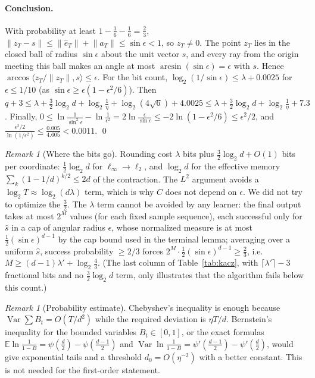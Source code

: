 \documentclass[11pt]{article}
\theoremstyle{definition}
\theoremstyle{remark}
\newtheorem{remark}[theorem]{Remark}
\newcommand{\E}{\mathbb E}
\newcommand{\ip}[2]{\langle #1,#2\rangle}
\newcommand{\norm}[1]{\lVert #1\rVert}
\begin{document}
\paragraph{Conclusion.} With probability at least \(1-\frac16-\frac16=\frac23\),
\(\norm{z_T-s}\le\norm{\hat e_T}+\norm{a_T}\le\sin\epsilon<1\), so \(z_T\ne0\). The
point \(z_T\) lies in the closed ball of radius \(\sin\epsilon\) about the unit vector \(s\), and every ray from the origin meeting this ball makes
an angle at most \(\arcsin(\sin\epsilon)=\epsilon\) with \(s\). Hence \(\arccos\ip{z_T/\norm{z_T}}{s}\le\epsilon\). For the bit count,
\(\log_2(1/\sin\epsilon)\le\lambda+0.0025\) for \(\epsilon\le1/10\) (as \(\sin\epsilon\ge\epsilon(1-\epsilon^2/6)\)). Then
\(q+3\le\lambda+\frac32\log_2d+\log_2\frac1\eta+\log_2(4\sqrt6)+4.0025\le\lambda+\frac32\log_2d+\log_2\frac1\eta+7.3\).
Finally, \(0\le\ln\frac1{\sin^2\epsilon}-\ln\frac1{\epsilon^2}=2\ln\frac{\epsilon}{\sin\epsilon}\le-2\ln(1-\epsilon^2/6)\le\epsilon^2/2\), and
\(\frac{\epsilon^2/2}{\ln(1/\epsilon^2)}\le\frac{0.005}{4.605}<0.0011\). \qed

\begin{remark}[Where the bits go]
Rounding cost \(\lambda\) bits plus \(\frac32\log_2 d+O(1)\) bits per coordinate: \(\frac12\log_2d\) for
\(\ell_\infty\to\ell_2\), and \(\log_2 d\) for the effective memory \(\sum_k(1-1/d)^{k/2}\le2d\) of the contraction. The \(L^2\) argument
avoids a \(\log_2 T\approx\log_2(d\lambda)\) term, which is why \(C\) does not depend on \(\epsilon\). We did not try to
optimize the \(\frac32\). The \(\lambda\) term cannot be avoided by any learner: the final output takes at most \(2^M\) values (for each fixed
sample sequence), each successful only for \(\hat s\) in a cap of angular radius \(\epsilon\), whose normalized measure is
at most \(\frac12(\sin\epsilon)^{d-1}\) by the cap bound used in the terminal lemma; averaging over a uniform \(\hat s\), success
probability \(\ge2/3\) forces \(2^M\cdot\frac12(\sin\epsilon)^{d-1}\ge\frac23\), i.e.\ \(M\ge(d-1)\lambda'+\log_2\frac43\). (The last column of
Table~\ref{tab:kacz}, with \(\lceil\lambda'\rceil-3\) fractional bits and no \(\frac32\log_2 d\) term, only illustrates
that the algorithm fails below this count.)
\end{remark}

\begin{remark}[Probability estimate]
Chebyshev's inequality is enough because \(\operatorname{Var}\sum B_t=O(T/d^2)\) while the required deviation is \(\eta T/d\). Bernstein's
inequality for the bounded variables \(B_t\in[0,1]\), or the exact formulas \(\E\ln\frac1{1-B}=\psi(\frac d2)-\psi(\frac{d-1}2)\) and
\(\operatorname{Var}\ln\frac1{1-B}=\psi'(\frac{d-1}2)-\psi'(\frac d2)\), would give exponential tails and a threshold
\(d_0=O(\eta^{-2})\) with a better constant. This is not needed for the first-order statement.
\end{remark}
\end{document}

